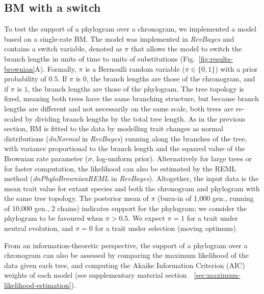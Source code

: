 \documentclass{article}
\newcommand{\PhyloSupport}{\pi}
\begin{document}
\subsection*{BM with a switch}
To test the support of a phylogram over a chronogram, we implemented a model based on a single-rate BM.
The model was implemented in \textit{RevBayes} and contains a switch variable, denoted as $\PhyloSupport$ that allows the model to switch the branch lengths in units of time to units of substitutions (Fig.~\ref{fig:results-brownian}A).
Formally, $\PhyloSupport$ is a Bernoulli random variable ($\PhyloSupport \in \{0, 1\}$) with a prior probability of $0.5$.
If $\PhyloSupport$ is $0$, the branch lengths are those of the chronogram, and if $\PhyloSupport$ is $1$, the branch lengths are those of the phylogram.
The tree topology is fixed, meaning both trees have the same branching structure, but because branch lengths are different and not necessarily on the same scale, both trees are re-scaled by dividing branch lengths by the total tree length.
As in the previous section, BM is fitted to the data by modelling trait changes as normal distributions (\textit{dnNormal} in \textit{RevBayes}) running along the branches of the tree, with variance proportional to the branch length and the squared value of the Brownian rate parameter ($\sigma$, log-uniform prior).
Alternatively for large trees or for faster computation, the likelihood can also be estimated by the REML method (\textit{dnPhyloBrownianREML} in \textit{RevBayes}).
Altogether, the input data is the mean trait value for extant species and both the chronogram and phylogram with the same tree topology.
The posterior mean of $\PhyloSupport$ (burn-in of 1,000 gen., running of 10,000 gen., 2 chains) indicates support for the phylogram; we consider the phylogram to be favoured when $\PhyloSupport > 0.5$.
We expect $\PhyloSupport = 1$ for a trait under neutral evolution, and $\PhyloSupport = 0$ for a trait under selection (moving optimum).

From an information-theoretic perspective, the support of a phylogram over a chronogram can also be assessed by comparing the maximum likelihood of the data given each tree, and computing the Akaike Information Criterion (AIC) weights of each model (see supplementary material section~~\ref{sec:maximum-likelihood-estimation}).
\end{document}
